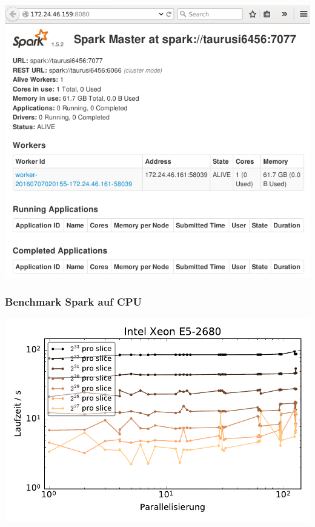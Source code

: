 \begin{frame}
    \centerline{\includegraphics[width=0.9\linewidth]{spark-main-view.png}}
\end{frame}

\begin{frame}
    \frametitle{Benchmark Spark auf CPU}
    \centerline{\includegraphics[width=0.9\linewidth]{cluster-strong-scaling-cpu.pdf}}
\end{frame}


